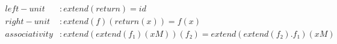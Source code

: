 \begin{align*}
  left-unit &: extend(return) = id               \\
  right-unit &: extend(f)(return(x)) = f(x)      \\
  associativity &: extend(extend(f₁)(xM))(f₂) = extend(extend(f₂) . f₁)(xM)
\end{align*}

